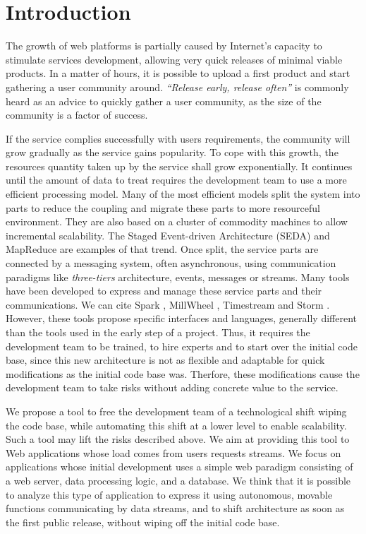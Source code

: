 \section{Introduction}


The growth of web platforms is partially caused by Internet's capacity to stimulate services development, allowing very quick releases of minimal viable products.
In a matter of hours, it is possible to upload a first product and start gathering a user community around.
\textit{``Release early, release often''} is commonly heard as an advice to quickly gather a user community, as the size of the community is a factor of success.

If the service complies successfully with users requirements, the community will grow gradually as the service gains popularity.
To cope with this growth, the resources quantity taken up by the service shall grow exponentially.
It continues until the amount of data to treat requires the development team to use a more efficient processing model.  %
Many of the most efficient models split the system into parts to reduce the coupling and migrate these parts to more resourceful environment.
They are also based on a cluster of commodity machines\cite{Fox1997} to allow incremental scalability.
The Staged Event-driven Architecture (SEDA)\cite{Welsh2000} and MapReduce \cite{Dean2008} are examples of that trend.
Once split, the service parts are connected by a messaging system, often asynchronous, using communication paradigms like \textit{three-tiers} architecture, events, messages or streams.
Many tools have been developed to express and manage these service parts and their communications.
We can cite Spark \cite{Zaharia2010}, MillWheel \cite{Akidau2013}, Timestream \cite{Qian2013} and Storm \cite{Marz2011}.
However, these tools propose specific interfaces and languages, generally different than the tools used in the early step of a project.
Thus, it requires the development team to be trained, to hire experts and to start over the initial code base, since this new architecture is not as flexible and adaptable for quick modifications as the initial code base was.
Therfore, these modifications cause the development team to take risks without adding concrete value to the service.

We propose a tool to free the development team of a technological shift wiping the code base, while automating this shift at a lower level to enable scalability.
Such a tool may lift the risks described above.
We aim at providing this tool to Web applications whose load comes from users requests streams.
We focus on applications whose initial development uses a simple web paradigm consisting of a web server, data processing logic, and a database.
We think that it is possible to analyze this type of application to express it using autonomous, movable functions communicating by data streams, and to shift architecture as soon as the first public release, without wiping off the initial code base.

